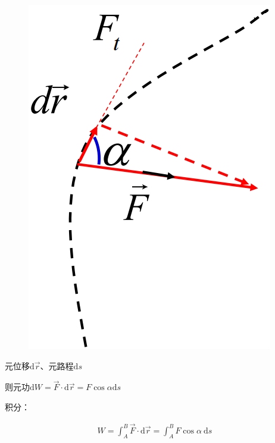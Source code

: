 \documentclass[
	12pt, %
	a4paper, %
]{myLegrandOrangeBook}
\newcommand{\rmd}{\mathrm{d}}
\begin{document}
\begin{figure}
    \centering
    \includegraphics[scale=0.2]{"Chapter 03 images/pic1.png"}
    \label{pic1}
\end{figure}

元位移\(\rmd \overrightarrow{r}\)、元路程\(\rmd s\)

则元功\(\rmd W = \overrightarrow{F} \cdot \rmd \overrightarrow{r} =
F \cos \alpha \rmd s\)

积分：

\begin{align}
    W=\int_A^B \overrightarrow{F} \cdot \rmd \overrightarrow{r}=\int_A^B F \cos \alpha \mathrm{~d} s
\end{align}
\end{document}
